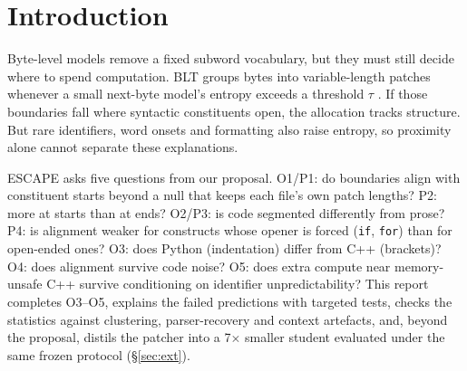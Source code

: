 \begin{abstract}
We test whether the entropy-triggered patch boundaries of the Byte Latent Transformer (BLT) align with syntactic constituent starts in Python, C++ and English, beyond a density-matched null and structure-blind baselines. On a frozen held-out split of \nTestAll{} files, start F1 exceeds the null in every language (margins \MarginPy{}, \MarginCpp{}, \MarginEn{}; $p\le10^{-4}$), but BLT \RTwoAll{} against the strongest baseline: word-start splitting beats it on precision and recall at once, and indentation does better still in Python. Four further predictions fail as stated, and follow-up tests explain each. Precision is far below recall because the patcher proposes \xPredPerTargetEn{}--\xPredPerTargetPy{} boundaries per target. Prose aligns best (P3) because English constituents begin at words. The forced-opener reversal (P4) comes from scoring the wrong byte. The memory-unsafe residual (O5) exists only after conditioning on identifier entropy. A 14.3M-parameter student distilled from the 99.5M patcher keeps about 90\% of the teacher's margin. Entropy boundaries are a genuine but shallow signal that follows word and line onsets more than syntax.
\end{abstract}

\section{Introduction}
Byte-level models remove a fixed subword vocabulary, but they must still decide where to spend computation. BLT groups bytes into variable-length patches whenever a small next-byte model's entropy exceeds a threshold $\tau$ \citep{pagnoni-etal-2025-byte}. If those boundaries fall where syntactic constituents open, the allocation tracks structure. But rare identifiers, word onsets and formatting also raise entropy, so proximity alone cannot separate these explanations.

ESCAPE asks five questions from our proposal. O1/P1: do boundaries align with constituent starts beyond a null that keeps each file's own patch lengths? P2: more at starts than at ends? O2/P3: is code segmented differently from prose? P4: is alignment weaker for constructs whose opener is forced (\texttt{if}, \texttt{for}) than for open-ended ones? O3: does Python (indentation) differ from C++ (brackets)? O4: does alignment survive code noise? O5: does extra compute near memory-unsafe C++ survive conditioning on identifier unpredictability? This report completes O3--O5, explains the failed predictions with targeted tests, checks the statistics against clustering, parser-recovery and context artefacts, and, beyond the proposal, distils the patcher into a 7$\times$ smaller student evaluated under the same frozen protocol (\S\ref{sec:ext}).

